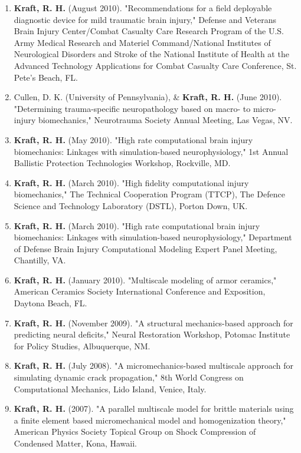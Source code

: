 \documentclass[a4paper,10pt]{article}
\begin{document}
\begin{enumerate}
  \item \textbf{\textbf{Kraft,} R. H.} (August 2010). "Recommendations for a field deployable diagnostic device for mild traumatic brain injury," Defense and Veterans Brain Injury Center/Combat Casualty Care Research Program of the U.S. Army Medical Research and Materiel Command/National Institutes of Neurological Disorders and Stroke of the National Institute of Health at the Advanced Technology Applications for Combat Casualty Care Conference, St. Pete's Beach, FL.
  \item Cullen, D. K. (University of Pennsylvania), \&
 \textbf{\textbf{Kraft,} R. H.} (June 2010). "Determining trauma-specific neuropathology based on macro- to micro-injury biomechanics," Neurotrauma Society Annual Meeting, Las Vegas, NV.
  \item \textbf{\textbf{Kraft,} R. H.} (May 2010). "High rate computational brain injury biomechanics: Linkages with simulation-based neurophysiology," 1st Annual Ballistic Protection Technologies Workshop, Rockville, MD.
  \item \textbf{\textbf{Kraft,} R. H.} (March 2010). "High fidelity computational injury biomechanics," The Technical Cooperation Program (TTCP), The Defence Science and Technology Laboratory (DSTL), Porton Down, UK.
  \item \textbf{\textbf{Kraft,} R. H.} (March 2010). "High rate computational brain injury biomechanics: Linkages with simulation-based neurophysiology," Department of Defense Brain Injury Computational Modeling Expert Panel Meeting, Chantilly, VA.
  \item \textbf{\textbf{Kraft,} R. H.} (January 2010). "Multiscale modeling of armor ceramics," American Ceramics Society International Conference and Exposition, Daytona Beach, FL.
  \item \textbf{\textbf{Kraft,} R. H.} (November 2009). "A structural mechanics-based approach for predicting neural deficits," Neural Restoration Workshop, Potomac Institute for Policy Studies, Albuquerque, NM.
  \item \textbf{\textbf{Kraft,} R. H.} (July 2008). "A micromechanics-based multiscale approach for simulating dynamic crack propagation," 8th World Congress on Computational Mechanics, Lido Island, Venice, Italy.
  \item \textbf{\textbf{Kraft,} R. H.} (2007). "A parallel multiscale model for brittle materials using a finite element based micromechanical model and homogenization theory," American Physics Society Topical Group on Shock Compression of Condensed Matter, Kona, Hawaii.

\end{enumerate}
\end{document}
